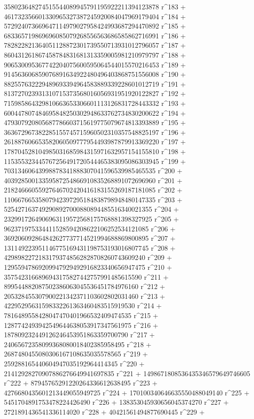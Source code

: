        358023648274515544089945791195922211394123878 r^183 + 
       461732356601330965327387245920084047969179404 r^184 + 
       572924073669647114979027958424993687294470892 r^185 + 
       683365719869696085079268556563686585862716991 r^186 + 
       782822821364051128872301739550713931012796057 r^187 + 
       860431261867458784831681313359005981210979797 r^188 + 
       906530095367742204075600595064544015570216453 r^189 + 
       914563606859076891634922480496403868751556008 r^190 + 
       882557632229489693394964583889339228601012719 r^191 + 
       813727023931310715373568016056931951920122827 r^192 + 
       715985864329810663653306601113126831728443332 r^193 + 
       600447807484695848250302948633762734830200622 r^194 + 
       479307920805687786603715619775079674813393889 r^195 + 
       363672967382285155745715960502310357548825197 r^196 + 
       261887606653582060509777954493987879913369220 r^197 + 
       178704528104985031685984315971632957154155810 r^198 + 
       115355323445767256491720544465383095086303945 r^199 + 
       70313460643998878341888307041596539985465535 r^200 + 
       40392850013359587254866910835268891072696960 r^201 + 
       21824666055927646702420416183155269187181085 r^202 + 
       11066766535807942397295184838798948480147335 r^203 + 
       5254271637492908927000880894485516340021355 r^204 + 
       2329917264906963119572568175768881398327925 r^205 + 
       962371975334411528594208622106252534121085 r^206 + 
       369206092864842627737714521994688869800895 r^207 + 
       131149223951146775169431198753193016807745 r^208 + 
       42989822721831793748562828708260743609240 r^209 + 
       12955947869209947929492916823340656947475 r^210 + 
       3575423166896943175827442757991485615590 r^211 + 
       899544882087502386063045536451784976160 r^212 + 
       205328455307900221342371103602802031460 r^213 + 
       42295295631598332261363460483515919530 r^214 + 
       7816489558428047470401966532409474535 r^215 + 
       1287742493942549644638053917347561975 r^216 + 
       187809232449126246453951863359700790 r^217 + 
       24065672358099368080018402385958495 r^218 + 
       2687480455080306167108635035578565 r^219 + 
       259288165440604947035192964414345 r^220 + 
       21412928270907886276649941697835 r^221 + 
       1498671808536435346579649746605 r^222 + 
       87945765291220264336612638495 r^223 + 
       4276680435601213449055949725 r^224 + 
       170100340646635550488049140 r^225 + 
       5451704891753478224426490 r^226 + 
       138353045930656045374270 r^227 + 
       2721891436541336114020 r^228 + 40421561494877690445 r^229 + 
